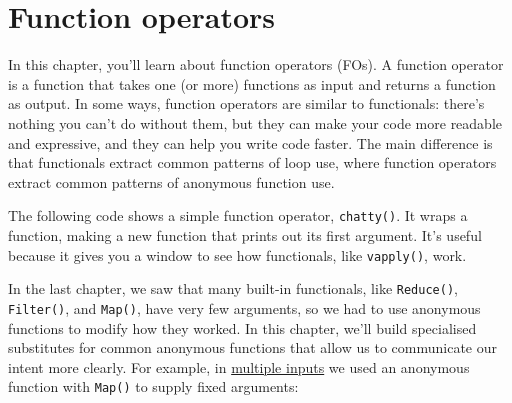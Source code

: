 \chapter{Function operators}\label{function-operators}

In this chapter, you'll learn about function operators (FOs). A function
operator is a function that takes one (or more) functions as input and
returns a function as output. In some ways, function operators are
similar to functionals: there's nothing you can't do without them, but
they can make your code more readable and expressive, and they can help
you write code faster. The main difference is that functionals extract
common patterns of loop use, where function operators extract common
patterns of anonymous function use. 

The following code shows a simple function operator, \texttt{chatty()}.
It wraps a function, making a new function that prints out its first
argument. It's useful because it gives you a window to see how
functionals, like \texttt{vapply()}, work.

\begin{Shaded}
\begin{Highlighting}[]
\StringTok{ }
    \StringTok{ }
    \NormalTok{(}\NormalTok{, } \NormalTok{)}
  \NormalTok{\}}
\NormalTok{\}}
\StringTok{ }\StringTok{ }
\StringTok{ }\NormalTok{(}\NormalTok{, }\NormalTok{, }\NormalTok{)}
\NormalTok{)}

\NormalTok{(}\NormalTok{))}
\end{Highlighting}
\end{Shaded}

In the last chapter, we saw that many built-in functionals, like
\texttt{Reduce()}, \texttt{Filter()}, and \texttt{Map()}, have very few
arguments, so we had to use anonymous functions to modify how they
worked. In this chapter, we'll build specialised substitutes for common
anonymous functions that allow us to communicate our intent more
clearly. For example, in \hyperref[map]{multiple inputs} we used an
anonymous function with \texttt{Map()} to supply fixed arguments:


